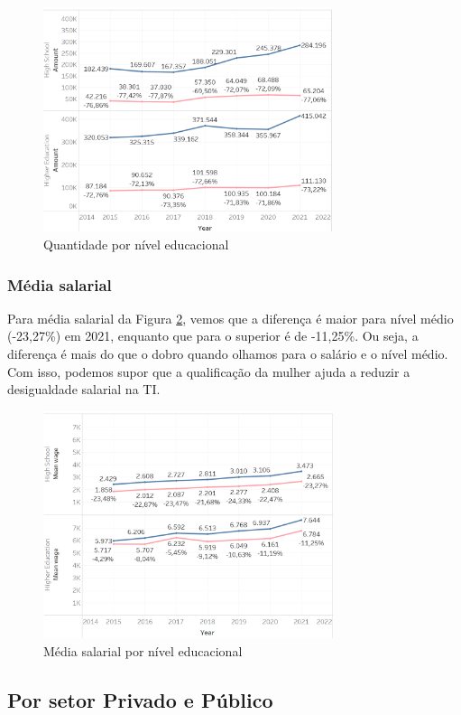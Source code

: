 \begin{figure}[htbp]
	\centerline{
		\includegraphics[width=85mm]{assets/2_qnt_educ.PNG}
	}
	\caption{Quantidade por nível educacional}
	\label{fig_2_qnt_educ}
\end{figure}

\subsubsection{Média salarial}

Para média salarial da Figura \ref{fig_2_sal_educ}, vemos que a diferença é maior para nível médio (-23,27\%) em 2021, enquanto que para o superior é de -11,25\%. Ou seja, a diferença é mais do que o dobro quando olhamos para o salário e o nível médio. Com isso, podemos supor que a qualificação da mulher ajuda a reduzir a desigualdade salarial na TI.

\begin{figure}[htbp]
	\centerline{
		\includegraphics[width=85mm]{assets/2_sal_educ.PNG}
	}
	\caption{Média salarial por nível educacional}
	\label{fig_2_sal_educ}
\end{figure}

\subsection{Por setor Privado e Público}  \label{sub:privpub}


